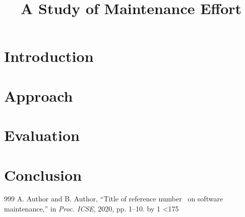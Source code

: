 \documentclass[conference,letterpaper]{IEEEtran}
\begin{document}
\title{A Study of Maintenance Effort}
\author{}
\maketitle
\begin{abstract}
\lipsum[1]
\end{abstract}
\section{Introduction}
\lipsum[2-20]
\section{Approach}
\lipsum[21-50]
\section{Evaluation}
\lipsum[51-80]
\section{Conclusion}
\lipsum[81-96]
\begin{thebibliography}{999}
\newcount\n {}
\loop {} A. Author and B. Author, ``Title of reference number \the\n\ on software maintenance,'' in \emph{Proc. ICSE}, 2020, pp. 1--10.
\advance\n by 1 \ifnum\n<175 \repeat
\end{thebibliography}
\end{document}
